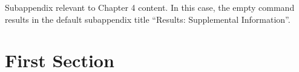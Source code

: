 Subappendix relevant to Chapter 4 content. In this case, the empty \noexpand\subappendix command results in the default subappendix title ``Results: Supplemental Information''.
\section{First Section}\label{chap4:app:sec:one}

